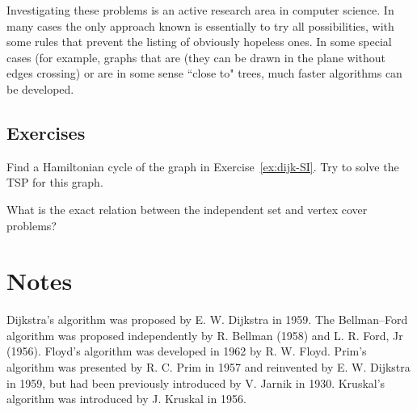 Investigating these problems is an active research area in computer
science. In many cases the only approach known is essentially to try
all possibilities, with some rules that prevent the listing of obviously
hopeless ones. In some special cases (for example, graphs that are 
 (they can be drawn in the plane without edges crossing) 
or are in some sense ``close to" trees, much faster algorithms can be developed.

\subsection*{Exercises}

\begin{Exercise}\label{exr:tsp}
Find a Hamiltonian cycle of the graph in Exercise~\ref{ex:dijk-SI}. Try to solve
the TSP for this graph.
\end{Exercise}

\begin{Exercise}\label{exr:indset}
What is the exact relation between the independent set and vertex cover problems?
\end{Exercise}

\section{Notes}

Dijkstra's algorithm was proposed by E. W. Dijkstra in 1959.
The Bellman--Ford algorithm was proposed independently by R.
Bellman (1958) and L. R. Ford, Jr (1956). Floyd's algorithm was developed in 
1962 by R. W. Floyd. Prim's algorithm was presented by R. C. Prim in 1957
and reinvented by E. W. Dijkstra in 1959, but had been previously introduced by 
V. Jarnik in 1930. Kruskal's algorithm was introduced by J. Kruskal in 1956.

